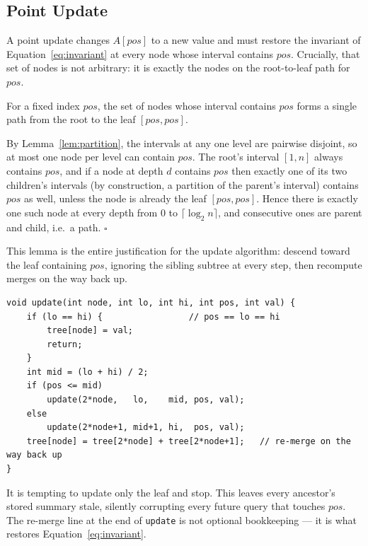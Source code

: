 \documentclass[
  11pt,
  a4paper,
  twoside=false,
  numbers=noenddot,
  headings=big,
  parskip=half,
  toc=bibliography,
  toc=listof,
  bibliography=totoc
]{scrreprt}
\newcounter{lemma}[chapter]
\newenvironment{proof}[1][Proof]{\par\noindent{\bfseries\sffamily\color{navy}#1.}\enspace}{\hfill$\square$\par\medskip}
\begin{document}
\subsection{Point Update}
\label{sec:update}
A point update changes $A[pos]$ to a new value and must restore the invariant of Equation~\eqref{eq:invariant} at every node whose interval contains $pos$. Crucially, that set of nodes is not arbitrary: it is exactly the nodes on the root-to-leaf path for $pos$.

\begin{lem}\label{lem:update-path}
For a fixed index $pos$, the set of nodes whose interval contains $pos$ forms a single path from the root to the leaf $[pos,pos]$.
\end{lem}
\begin{proof}
By Lemma~\ref{lem:partition}, the intervals at any one level are pairwise disjoint, so at most one node per level can contain $pos$. The root's interval $[1,n]$ always contains $pos$, and if a node at depth $d$ contains $pos$ then exactly one of its two children's intervals (by construction, a partition of the parent's interval) contains $pos$ as well, unless the node is already the leaf $[pos,pos]$. Hence there is exactly one such node at every depth from $0$ to $\lceil\log_2 n\rceil$, and consecutive ones are parent and child, i.e.\ a path.
\end{proof}

This lemma is the entire justification for the update algorithm: descend toward the leaf containing $pos$, ignoring the sibling subtree at every step, then recompute merges on the way back up.

\begin{lstlisting}[style=cpp, caption={Point update.}, label={alg:update}]
void update(int node, int lo, int hi, int pos, int val) {
    if (lo == hi) {                 // pos == lo == hi
        tree[node] = val;
        return;
    }
    int mid = (lo + hi) / 2;
    if (pos <= mid)
        update(2*node,   lo,    mid, pos, val);
    else
        update(2*node+1, mid+1, hi,  pos, val);
    tree[node] = tree[2*node] + tree[2*node+1];   // re-merge on the way back up
}
\end{lstlisting}

\begin{pitfall}
It is tempting to update only the leaf and stop. This leaves every ancestor's stored summary stale, silently corrupting every future query that touches $pos$. The re-merge line at the end of \texttt{update} is not optional bookkeeping --- it is what restores Equation~\eqref{eq:invariant}.
\end{pitfall}
\end{document}
